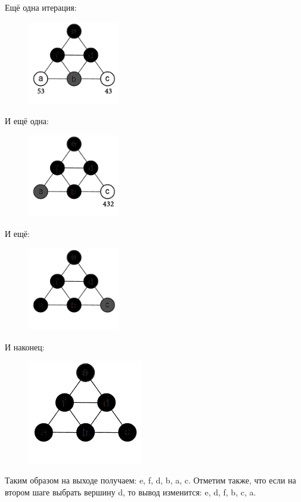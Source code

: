 \documentclass[a4paper,14pt]{article}
\begin{document}
	\newpage Ещё одна итерация:
	\begin{figure}[h!]
		\centering
		\includegraphics[width=40mm]{img/5.png}
	\end{figure}
	\newline И ещё одна:
	\begin{figure}[h!]
		\centering
		\includegraphics[width=40mm]{img/6.png}
	\end{figure}
	\newline И ещё:
	\begin{figure}[h!]
		\centering
		\includegraphics[width=40mm]{img/7.png}
	\end{figure}
	\newline И наконец:
	\begin{figure}[h!]
		\centering
		\includegraphics[width=50mm]{img/8.png}
	\end{figure}
	\newline Таким образом на выходе получаем: e, f, d, b, a, c.
	\newline Отметим также, что если на втором шаге выбрать вершину d, то вывод изменится: e, d, f, b, c, a.
\end{document}
